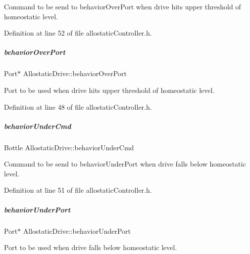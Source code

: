 Command to be send to behavior\+Over\+Port when drive hits upper threshold of homeostatic level. 



Definition at line 52 of file allostatic\+Controller.\+h.

\mbox{\label{group__allostaticController_a0ae7b5cdd6d2ef10fc83a0b426019615}} 
\subparagraph{\texorpdfstring{behavior\+Over\+Port}{behaviorOverPort}}
{\footnotesize\ttfamily Port$\ast$ Allostatic\+Drive\+::behavior\+Over\+Port}



Port to be used when drive hits upper threshold of homeostatic level. 



Definition at line 48 of file allostatic\+Controller.\+h.

\mbox{\label{group__allostaticController_abae41498adb72667a5e884242fbccff6}} 
\subparagraph{\texorpdfstring{behavior\+Under\+Cmd}{behaviorUnderCmd}}
{\footnotesize\ttfamily Bottle Allostatic\+Drive\+::behavior\+Under\+Cmd}



Command to be send to behavior\+Under\+Port when drive falls below homeostatic level. 



Definition at line 51 of file allostatic\+Controller.\+h.

\mbox{\label{group__allostaticController_a1cbe962d96a15bf82f7e57a11ab3c1c0}} 
\subparagraph{\texorpdfstring{behavior\+Under\+Port}{behaviorUnderPort}}
{\footnotesize\ttfamily Port$\ast$ Allostatic\+Drive\+::behavior\+Under\+Port}



Port to be used when drive falls below homeostatic level. 



